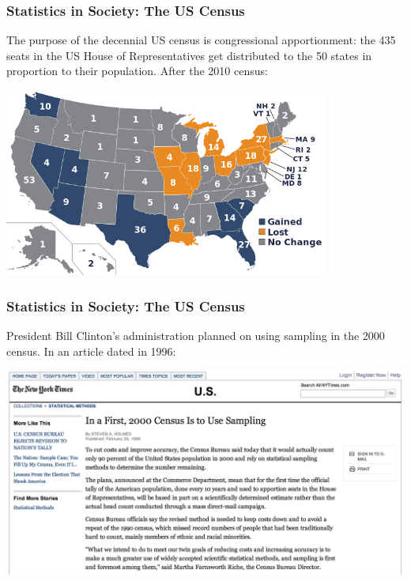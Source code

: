 \documentclass[handout]{beamer}
\newcommand{\blue}[1]{\textcolor{blue2}{#1}}
\begin{document}
\begin{frame}
\frametitle{Statistics in Society:  The US Census}

The purpose of the decennial US census is \blue{congressional apportionment}: the 435 seats in the US House of Representatives get distributed to the 50 states in proportion to their population.  \pause After the 2010 census:

\begin{center}
\includegraphics[width=0.8\textwidth]{figure/apportionment.png}
\end{center}



\end{frame}


\begin{frame}
\frametitle{Statistics in Society:  The US Census}

President Bill Clinton's administration planned on using sampling in the 2000 census.  In an article dated in 1996:
\pause \begin{center}
\includegraphics[width=\textwidth]{figure/census_2000.png}
\end{center}

\end{frame}
\end{document}
